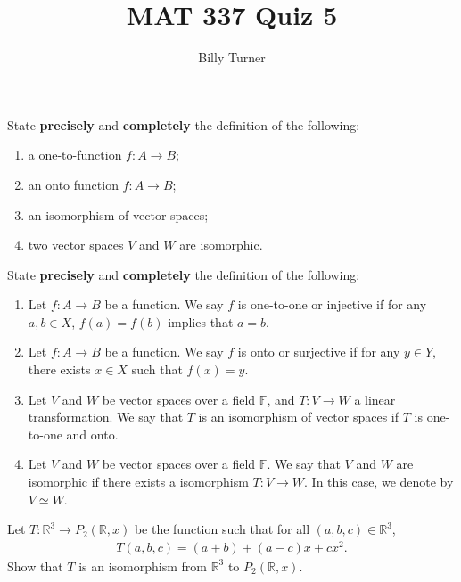 \documentclass[12pt,answers]{exam}
\newcommand{\F}{\mathbb{F}}
\newcommand{\R}{\mathbb{R}}
\newenvironment{problem}[2][Problem]{\begin{trivlist}
\item[\hskip \labelsep {\bfseries #1}\hskip \labelsep {\bfseries #2.}]}{\end{trivlist}}
\begin{document}
\title{MAT 337 Quiz 5} 
\author{Billy Turner}
\maketitle
\thispagestyle{empty}

\begin{problem}{1}
State \textbf{precisely} and \textbf{completely} the definition of the following:
\begin{enumerate}[label=(\alph*)]
\item a one-to-function $f:A\rightarrow B$;
\item an onto function $f:A\rightarrow B$;
\item an isomorphism of vector spaces;
\item two vector spaces $V$ and $W$ are isomorphic.
\end{enumerate}
\end{problem}

\begin{solution}
State \textbf{precisely} and \textbf{completely} the definition of the following:
\begin{enumerate}[label=(\alph*)]
\item Let $f:A\rightarrow B$ be a function. We say $f$ is one-to-one or injective if for any $a,b\in X$, $f(a)=f(b)$ implies that $a=b$.
\item Let $f:A\rightarrow B$ be a function. We say $f$ is onto or surjective if for any $y\in Y$, there exists $x\in X$ such that $f(x)=y$.
\item Let $V$ and $W$ be vector spaces over a field $\F$, and $T:V\rightarrow W$ a linear transformation. We say that $T$ is an isomorphism of vector spaces if $T$ is one-to-one and onto.
\item Let $V$ and $W$ be vector spaces over a field $\F$. We say that $V$ and $W$ are isomorphic if there exists a isomorphism $T:V\rightarrow W$. In this case, we denote by $V\simeq W$. 
\end{enumerate}
\end{solution}

\begin{problem}{2}
Let $T:\R^{3} \rightarrow P_{2}(\R,x)$ be the function such that for all $(a,b,c)\in \R^{3}$,
\begin{align*}
    T(a,b,c)=(a+b)+(a-c)x+cx^{2}.
\end{align*} 
Show that $T$ is an isomorphism from $\R^{3}$ to $P_{2}(\R,x)$.
\end{problem}
\end{document}
